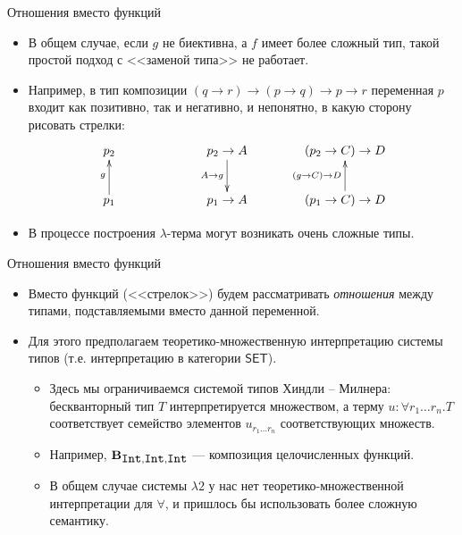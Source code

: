 \documentclass[xcolor=dvipsnames]{beamer}
\newcommand{\Bx}{\mathbf{B}}
\newcommand{\Int}{\mbox{\texttt{Int}}}
\newcommand{\SET}{\mathsf{SET}}
\begin{document}
\begin{frame}{Отношения вместо функций}
 \begin{itemize}[<+->]
  \item В общем случае, если $g$ не биективна, а $f$ имеет более сложный тип, такой простой подход с <<заменой типа>> не работает.
  \item Например, в тип композиции $(q \to r) \to (p \to q) \to p \to r$ переменная $p$ входит как позитивно, так и негативно, и непонятно, в какую сторону рисовать стрелки:
  \[
   \xymatrix@{}{
   p_1 \ar[r]^{g} & p_2 \\
   p_1 \to A & \ar[l]_{A\to g}  p_2 \to A \\
   (p_1 \to C) \to D \ar[r]^{(g \to C) \to D} & (p_2 \to C) \to D
   }
  \]
  \item В процессе построения $\lambda$-терма могут возникать очень сложные типы.
 \end{itemize}

\end{frame}

\begin{frame}{Отношения вместо функций}
 
 \begin{itemize}[<+->]
  \item Вместо функций (<<стрелок>>) будем рассматривать {\em отношения} между типами, подставляемыми вместо данной переменной.
  \item Для этого предполагаем теоретико-множественную интерпретацию системы типов (т.е. интерпретацию в категории $\SET$).
  \begin{itemize}
    \item Здесь мы ограничиваемся системой типов Хиндли -- Милнера: бескванторный тип $T$ интерпретируется множеством, а терму $u : \forall r_1 \ldots r_n . T$ соответствует семейство элементов $u_{r_1 \ldots r_n}$ соответствующих множеств.
    \item Например, $\Bx_{\Int,\Int,\Int}$ --- композиция целочисленных функций.
    \item В общем случае системы $\lambda 2$ у нас нет теоретико-множественной интерпретации для $\forall$, и пришлось бы использовать более сложную семантику.
  \end{itemize}
 \end{itemize}

\end{frame}
\end{document}
